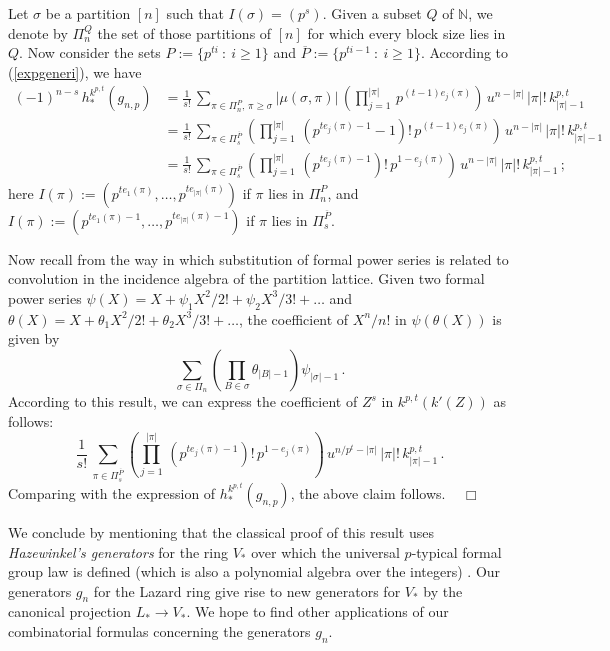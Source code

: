 \documentclass[a4paper,12pt]{amsart}
\theoremstyle{definition}
\numberwithin{equation}{section}
\newcommand{\bN}{{\mathbb N}}
\newcommand{\s}{\sigma}
\newcommand{\setp}[2]{\{#1\::\:#2\}}
\newcommand{\eproof}{\mbox{$\;\;\;\Box$}}
\begin{document}
Let $\s$ be a partition $[n]$ such that $I(\s)=(p^s)$. Given a subset $Q$ of $\bN$, we denote by $\varPi_n^Q$ the set of those partitions of $[n]$ for which every block size lies in $Q$. Now consider the sets $P:=\setp{p^{ti}}{i\ge 1}$ and $\overline{P}:=\setp{p^{ti-1}}{i\ge 1}$. According to (\ref{expgeneri}), we have
\begin{align*}
(-1)^{n-s}\,h_*^{k^{p,t}}(g_{n,p})&=\frac{1}{s!}\,\sum_{\pi\in\varPi_{n}^P,\,\pi\ge\s} |\mu(\s,\pi)|\,\left(\prod_{j=1}^{|\pi|}\,p^{(t-1)e_j(\pi)}\right)\,u^{n-|\pi|}\,|\pi|!\,k^{p,t}_{|\pi|-1}\\
&=\frac{1}{s!}\,\sum_{\pi\in\varPi_{s}^{\overline{P}}} \left(\prod_{j=1}^{|\pi|}\,(p^{t e_j(\pi)-1}-1)!\,p^{(t-1)e_j(\pi)}\right)\,u^{n-|\pi|}\,|\pi|!\,k^{p,t}_{|\pi|-1}\\
&=\frac{1}{s!}\,\sum_{\pi\in\varPi_{s}^{\overline{P}}} \left(\prod_{j=1}^{|\pi|}\,(p^{t e_j(\pi)-1})!\,p^{1-e_j(\pi)}\right)\,u^{n-|\pi|}\,|\pi|!\,k^{p,t}_{|\pi|-1}\,;
\end{align*}
here $I(\pi):=(p^{t e_1(\pi)},\ldots,p^{t e_{|\pi|}(\pi)})$ if $\pi$ lies in $\varPi_{n}^P$, and $I(\pi):=(p^{t e_1(\pi)-1},\ldots,p^{t e_{|\pi|}(\pi)-1})$ if $\pi$ lies in $\varPi_{s}^{\overline{P}}$. 

Now recall from \cite{drsfct6} the way in which substitution of formal power series is related to convolution in the incidence algebra of the partition lattice. Given two formal power series $\psi(X)=X+\psi_1 X^2/2!+\psi_2 X^3/3!+\ldots$ and $\theta(X)=X+\theta_1 X^2/2!+\theta_2 X^3/3!+\ldots$, the coefficient of $X^n/n!$ in $\psi(\theta(X))$ is given by 
\[\sum_{\s\in\varPi_n}\left(\prod_{B\in\s}\theta_{|B|-1}\right)\psi_{|\s|-1}\,.\]
According to this result, we can express the coefficient of $Z^s$ in $k^{p,t}(k'(Z))$ as follows:
\[ \frac{1}{s!}\,\sum_{\pi\in\varPi_{s}^{\overline{P}}} \left(\prod_{j=1}^{|\pi|}\,(p^{t e_j(\pi)-1})!\,p^{1-e_j(\pi)}\right)\,u^{n/p^t-|\pi|}\,|\pi|!\,k^{p,t}_{|\pi|-1}\,.\]
Comparing with the expression of $h_*^{k^{p,t}}(g_{n,p})$, the above claim follows.
\eproof

We conclude by mentioning that the classical proof of this result uses {\em Hazewinkel's generators} for the ring $V_*$ over which the universal $p$-typical formal group law is defined (which is also a polynomial algebra over the integers) . Our generators $g_n$ for the Lazard ring give rise to new generators for $V_*$ by the canonical projection $L_*\rightarrow V_*$. We hope to find other applications of our combinatorial formulas concerning the generators $g_n$.
\end{document}
